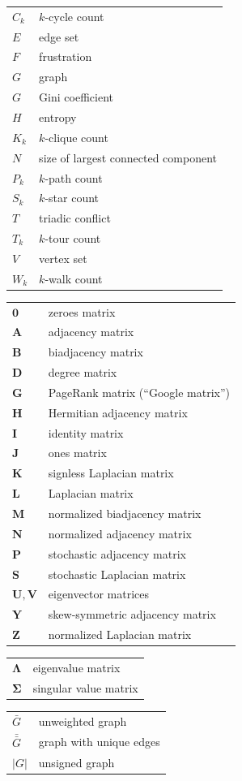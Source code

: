 \documentclass{article}
\begin{document}
\begin{tabular}{ll}
  $C_k$ & $k$-cycle count \\
  $E$ & edge set \\
  $F$ & frustration \\
  $G$ & graph \\
  $G$ & Gini coefficient \\
  $H$ & entropy \\
  $K_k$ & $k$-clique count \\
  $N$   & size of largest connected component\\
  $P_k$ & $k$-path count \\
  $S_k$ & $k$-star count \\
  $T$   & triadic conflict \\
  $T_k$ & $k$-tour count \\
  $V$   & vertex set \\
  $W_k$ & $k$-walk count
\end{tabular}

\begin{tabular}{ll}
  $\mathbf 0$ & zeroes matrix \\
  $\mathbf A$ & adjacency matrix \\
  $\mathbf B$ & biadjacency matrix \\
  $\mathbf D$ & degree matrix \\
  $\mathbf G$ & PageRank matrix (``Google matrix'') \\
  $\mathbf H$ & Hermitian adjacency matrix \\
  $\mathbf I$ & identity matrix \\
  $\mathbf J$ & ones matrix \\
  $\mathbf K$ & signless Laplacian matrix \\
  $\mathbf L$ & Laplacian matrix \\
  $\mathbf M$ & normalized biadjacency matrix \\
  $\mathbf N$ & normalized adjacency matrix \\
  $\mathbf P$ & stochastic adjacency matrix \\
  $\mathbf S$ & stochastic Laplacian matrix \\
  $\mathbf U, \mathbf V$ & eigenvector matrices \\
  $\mathbf Y$ & skew-symmetric adjacency matrix \\
  $\mathbf Z$ & normalized Laplacian matrix 
\end{tabular}

\begin{tabular}{ll}
  $\mathbf \Lambda$ & eigenvalue matrix \\
  $\mathbf \Sigma$ & singular value matrix 
\end{tabular}

\begin{tabular}{ll}
  $\bar G$ & unweighted graph \\
  $\bar{\bar G}$ & graph with unique edges \\
  $|G|$ & unsigned graph 
\end{tabular}
\end{document}
